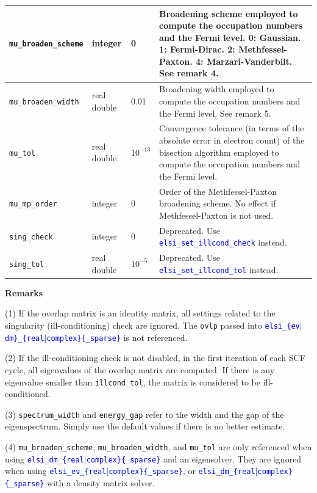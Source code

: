 \documentclass{report}
\newcommand{\api}[1]{\textcolor{blue}{\texttt{#1}}}
\begin{document}
\begin{longtable}[]{|p{30mm}|p{20mm}|p{15mm}|p{97mm}|}
\hline
\texttt{mu\_broaden\_scheme} & integer     & 0           & Broadening scheme employed to compute the occupation numbers and the Fermi level. 0: Gaussian. 1: Fermi-Dirac. 2: Methfessel-Paxton. 4: Marzari-Vanderbilt. See remark 4.\\
\hline
\texttt{mu\_broaden\_width}  & real double & 0.01        & Broadening width employed to compute the occupation numbers and the Fermi level. See remark 5.\\
\hline
\texttt{mu\_tol}             & real double & $10^{-13}$  & Convergence tolerance (in terms of the absolute error in electron count) of the bisection algorithm employed to compute the occupation numbers and the Fermi level.\\
\hline
\texttt{mu\_mp\_order}       & integer     & 0           & Order of the Methfessel-Paxton broadening scheme. No effect if Methfessel-Paxton is not used.\\
\hline
\texttt{sing\_check}         & integer     & 0           & Deprecated. Use \api{elsi\_set\_illcond\_check} instead.\\
\hline
\texttt{sing\_tol}           & real double & $10^{-5}$   & Deprecated. Use \api{elsi\_set\_illcond\_tol} instead.\\
\hline
\end{longtable}

\textbf{Remarks}

(1) If the overlap matrix is an identity matrix, all settings related to the singularity (ill-conditioning) check are ignored. The \texttt{ovlp} passed into \api{elsi\_\{ev$\vert$dm\}\_\{real$\vert$complex\}\{\_sparse\}} is not referenced.

(2) If the ill-conditioning check is not disabled, in the first iteration of each SCF cycle, all eigenvalues of the overlap matrix are computed. If there is any eigenvalue smaller than \texttt{illcond\_tol}, the matrix is considered to be ill-conditioned.

(3) \texttt{spectrum\_width} and \texttt{energy\_gap} refer to the width and the gap of the eigenspectrum. Simply use the default values if there is no better estimate.

(4) \texttt{mu\_broaden\_scheme}, \texttt{mu\_broaden\_width}, and  \texttt{mu\_tol} are only referenced when using \api{elsi\_dm\_\{real$\vert$complex\}\{\_sparse\}} and an eigensolver. They are ignored when using \api{elsi\_ev\_\{real$\vert$complex\}\{\_sparse\}}, or \api{elsi\_dm\_\{real$\vert$complex\}\{\_sparse\}} with a density matrix solver.
\end{document}
